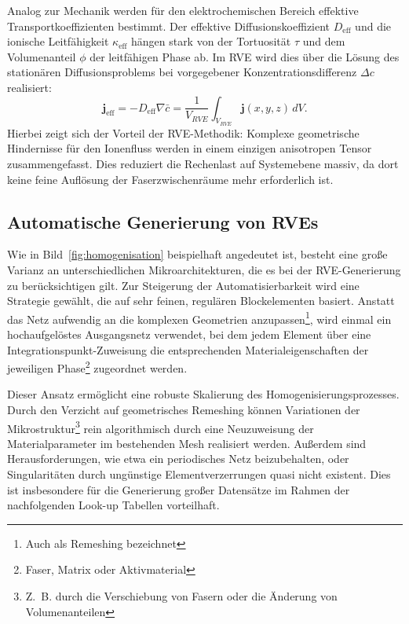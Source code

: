 Analog zur Mechanik werden für den elektrochemischen Bereich effektive Transportkoeffizienten bestimmt. Der effektive Diffusionskoeffizient $D_{\text{eff}}$ und die ionische Leitfähigkeit $\kappa_{\text{eff}}$ hängen stark von der Tortuosität $\tau$ und dem Volumenanteil $\phi$ der leitfähigen Phase ab. Im RVE wird dies über die Lösung des stationären Diffusionsproblems bei vorgegebener Konzentrationsdifferenz $\Delta c$ realisiert:
\begin{equation}
    \boldsymbol{j}_{\text{eff}} = -D_{\text{eff}} \nabla \bar{c} = \frac{1}{V_{RVE}} \int_{V_{RVE}} \boldsymbol{j}(x, y, z) \, dV.
\end{equation}
Hierbei zeigt sich der Vorteil der RVE-Methodik: Komplexe geometrische Hindernisse für den Ionenfluss werden in einem einzigen anisotropen Tensor zusammengefasst. Dies reduziert die Rechenlast auf Systemebene massiv, da dort keine feine Auflösung der Faserzwischenräume mehr erforderlich ist.

\subsection{\label{sec:automated_rves}Automatische Generierung von RVEs}

Wie in Bild~\ref{fig:homogenisation} beispielhaft angedeutet ist, besteht eine große Varianz an unterschiedlichen Mikroarchitekturen, die es bei der RVE-Generierung zu berücksichtigen gilt.
Zur Steigerung der Automatisierbarkeit wird eine Strategie gewählt, die auf sehr feinen, regulären Blockelementen basiert. Anstatt das Netz aufwendig an die komplexen Geometrien anzupassen\footnote{Auch als Remeshing bezeichnet}, wird einmal ein hochaufgelöstes Ausgangsnetz verwendet, bei dem jedem Element über eine Integrationspunkt-Zuweisung die entsprechenden Materialeigenschaften der jeweiligen Phase\footnote{Faser, Matrix oder Aktivmaterial} zugeordnet werden.

Dieser Ansatz ermöglicht eine robuste Skalierung des Homogenisierungsprozesses. Durch den Verzicht auf geometrisches Remeshing können Variationen der Mikrostruktur\footnote{Z.~B. durch die Verschiebung von Fasern oder die Änderung von Volumenanteilen} rein algorithmisch durch eine Neuzuweisung der Materialparameter im bestehenden Mesh realisiert werden. Außerdem sind Herausforderungen, wie etwa ein periodisches Netz beizubehalten, oder Singularitäten durch ungünstige Elementverzerrungen quasi nicht existent. Dies ist insbesondere für die Generierung großer Datensätze im Rahmen der nachfolgenden Look-up Tabellen vorteilhaft.

